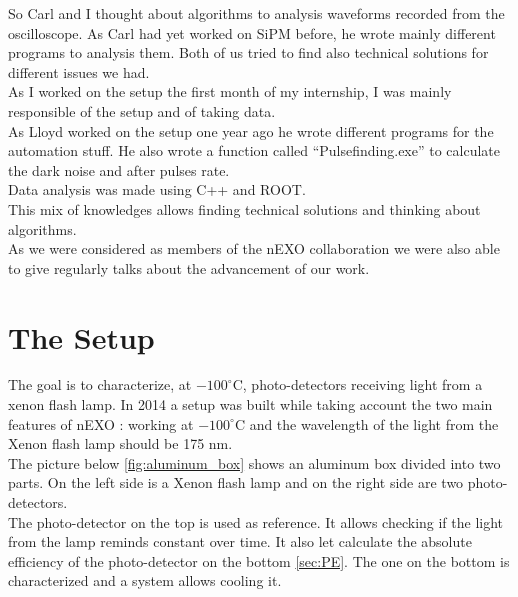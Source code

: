 \documentclass[a4paper, 11pt]{report}%
\newcommand{\xfl}{Xenon flash lamp }
\begin{document}
  So Carl and I thought about algorithms to analysis waveforms recorded from the oscilloscope. 
  As Carl had yet worked on SiPM before, he wrote mainly different programs to analysis them.
  Both of us tried to find also technical solutions for different issues we had.\\
  As I worked on the setup the first month of my internship, I was mainly responsible of the setup and of taking data.\\
  As Lloyd worked on the setup one year ago he wrote different programs for the automation stuff. He also wrote a function called 
  ``Pulsefinding.exe'' to calculate the dark noise and after pulses rate.\\
  Data analysis was made using C++ and ROOT. \\  
  This mix of knowledges allows finding technical solutions and thinking about algorithms. 
  \\
  
  As we were considered as members of the nEXO collaboration we were also able to give regularly talks about the advancement of 
  our work.
  
  \section{The Setup}
  
  The goal is to characterize, at $-100^{\circ}$C, photo-detectors receiving light from a xenon flash lamp. In 2014 a setup was built while taking 
  account the two main features of nEXO : working at $-100^{\circ}$C and the wavelength of the light from the \xfl should be 175 nm.\\ 
  The picture below \ref{fig:aluminum_box} shows an aluminum box divided into two parts. On the left side is a Xenon flash lamp and 
  on the right side are two photo-detectors. \\
  The photo-detector on the top is used as reference. It allows checking if the light from the lamp reminds constant over time. It also let calculate
  the absolute efficiency of the photo-detector on the bottom \ref{sec:PE}.
  The one on the bottom is characterized and a system allows cooling it.     
  
\end{document}
